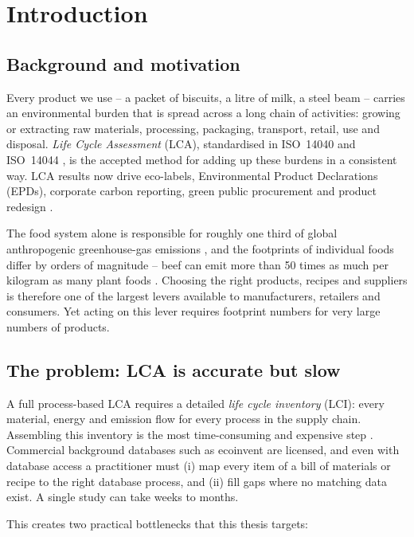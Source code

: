 \chapter{Introduction}
\label{ch:intro}

\section{Background and motivation}

Every product we use -- a packet of biscuits, a litre of milk, a steel beam -- carries an
environmental burden that is spread across a long chain of activities: growing or extracting raw
materials, processing, packaging, transport, retail, use and disposal. \emph{Life Cycle
Assessment} (LCA), standardised in ISO~14040 and ISO~14044 \citep{iso14040,iso14044}, is the
accepted method for adding up these burdens in a consistent way. LCA results now drive
eco-labels, Environmental Product Declarations (EPDs), corporate carbon reporting, green public
procurement and product redesign \citep{hellweg2014,finnveden2009}.

The food system alone is responsible for roughly one third of global anthropogenic greenhouse-gas
emissions \citep{crippa2021}, and the footprints of individual foods differ by orders of magnitude
-- beef can emit more than 50 times as much per kilogram as many plant foods \citep{poore2018}.
Choosing the right products, recipes and suppliers is therefore one of the largest levers
available to manufacturers, retailers and consumers. Yet acting on this lever requires
footprint numbers for very large numbers of products.

\section{The problem: LCA is accurate but slow}

A full process-based LCA requires a detailed \emph{life cycle inventory} (LCI): every material,
energy and emission flow for every process in the supply chain. Assembling this inventory is the
most time-consuming and expensive step \citep{reap2008}. Commercial background databases such as
ecoinvent \citep{wernet2016} are licensed, and even with database access a practitioner must
(i) map every item of a bill of materials or recipe to the right database process, and
(ii) fill gaps where no matching data exist. A single study can take weeks to months.

This creates two practical bottlenecks that this thesis targets:

